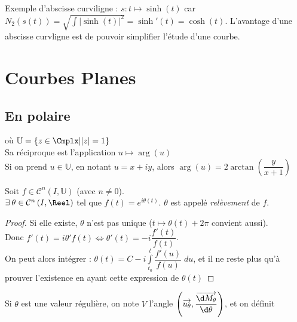 \documentclass[11pt,a4paper,fleqn,pdftex]{report}
\begin{document}
Exemple d'abscisse curviligne : $s : t \mapsto \sinh (t)$ car $N_2\left( s(t) \right) = \sqrt{\int |\sinh (t)|^2} = 
 \sinh{}'(t) = \cosh (t)$. L'avantage d'une abscisse curvligne est de pouvoir simplifier l'étude d'une courbe. \\

\section{Courbes Planes}
\subsection{En polaire}
\begin{dfn}
\ibox{$\theta \mapsto e^{i\theta}$ est une bijection de $]-\pi , \pi [$ sur $\mathbb{U}\backslash \lbrace -1 \rbrace$} où $\mathbb{U}=\lbrace z \in \Cmplx | |z| = 1 \rbrace $\\
Sa réciproque est l'application $u \mapsto \arg(u)$\\
Si on prend $u \in \mathbb{U}$, en notant $u=x+iy$, alors $\arg(u)=2\arctan \left( \dfrac{y}{x+1} \right)
$
\end{dfn}

\begin{itheorem}
Soit $f \in \mathcal{C}^n\left( I,\mathbb{U} \right)$ (avec $n \neq 0$). \\
$\exists \: \theta \in \mathcal{C}^n\left( I,\Reel \right)$ tel que $f(t) = e^{i\theta{}(t)}$. $\theta$ est appelé \emph{relèvement} de $f$.
\end{itheorem}
\begin{proof}
Si elle existe, $\theta$ n'est pas unique ($t \mapsto \theta(t) + 2\pi$ convient aussi).\\
Donc $f'(t) = i\theta{}' f(t) \Leftrightarrow \theta{}'(t)=-i\dfrac{f'(t)}{f(t)}$. \\
On peut alors intégrer : $\theta (t) = C - i \int \limits_{t_0}^t \dfrac{f'(u)}{f(u)}\; du$, et il ne reste plus qu'à prouver l'existence en ayant cette expression de $\theta{}(t)$
\end{proof}

\begin{dfn}
Si $\theta$ est une valeur régulière, on note $V$ l'angle $\left( \overrightarrow{u_{\theta}},\dfrac{\overrightarrow{\d M_\theta}}{\d\theta}  \right)$, et on définit 
\end{dfn}
\end{document}
